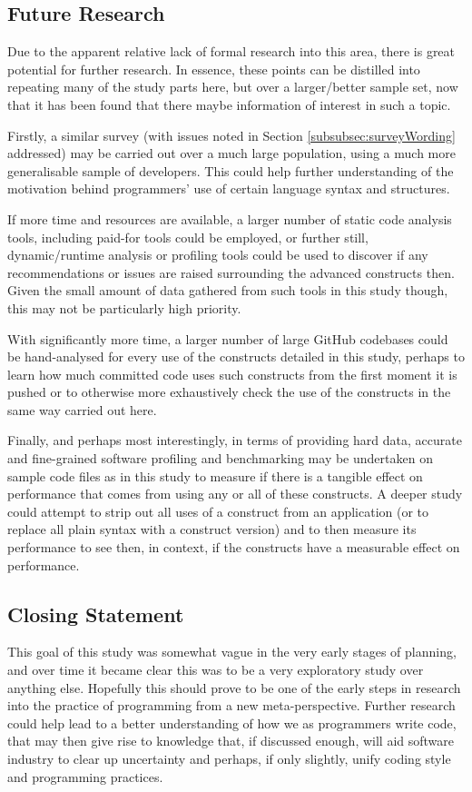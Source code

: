 \documentclass{article}
\begin{document}
    \subsection{Future Research}
        Due to the apparent relative lack of formal research into this area, there is great potential for further research. In essence, these points can be distilled into repeating many of the study parts here, but over a larger/better sample set, now that it has been found that there maybe information of interest in such a topic.
        
        Firstly, a similar survey (with issues noted in Section \ref{subsubsec:surveyWording} addressed) may be carried out over a much large population, using a much more generalisable sample of developers. This could help further understanding of the motivation behind programmers' use of certain language syntax and structures.
            
        If more time and resources are available, a larger number of static code analysis tools, including paid-for tools could be employed, or further still, dynamic/runtime analysis or profiling tools could be used to discover if any recommendations or issues are raised surrounding the advanced constructs then. Given the small amount of data gathered from such tools in this study though, this may not be particularly high priority.
        
        With significantly more time, a larger number of large GitHub codebases could be hand-analysed for every use of the constructs detailed in this study, perhaps to learn how much committed code uses such constructs from the first moment it is pushed or to otherwise more exhaustively check the use of the constructs in the same way carried out here.
            
        Finally, and perhaps most interestingly, in terms of providing hard data, accurate and fine-grained software profiling and benchmarking may be undertaken on sample code files as in this study to measure if there is a tangible effect on performance that comes from using any or all of these constructs. A deeper study could attempt to strip out all uses of a construct from an application (or to replace all plain syntax with a construct version) and to then measure its performance to see then, in context, if the constructs have a measurable effect on performance.
    \subsection{Closing Statement}
        This goal of this study was somewhat vague in the very early stages of planning, and over time it became clear this was to be a very exploratory study over anything else. Hopefully this should prove to be one of the early steps in research into the practice of programming from a new meta-perspective. Further research could help lead to a better understanding of how we as programmers write code, that may then give rise to knowledge that, if discussed enough,  will aid software industry to clear up uncertainty and perhaps, if only slightly, unify coding style and programming practices.
\end{document}
